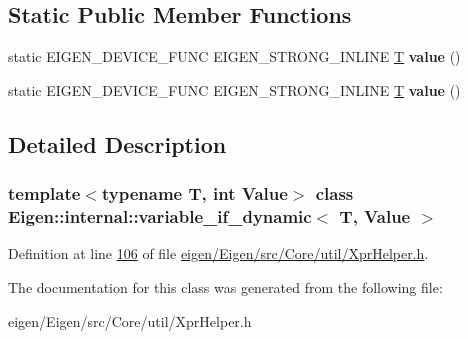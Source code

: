\subsection*{Static Public Member Functions}
\begin{DoxyCompactItemize}
\item 
\mbox{\label{class_eigen_1_1internal_1_1variable__if__dynamic_a1bb2387fda14c673bc6b0004f6849f84}} 
static E\+I\+G\+E\+N\+\_\+\+D\+E\+V\+I\+C\+E\+\_\+\+F\+U\+NC E\+I\+G\+E\+N\+\_\+\+S\+T\+R\+O\+N\+G\+\_\+\+I\+N\+L\+I\+NE \hyperlink{group___sparse_core___module}{T} {\bfseries value} ()
\item 
\mbox{\label{class_eigen_1_1internal_1_1variable__if__dynamic_a1bb2387fda14c673bc6b0004f6849f84}} 
static E\+I\+G\+E\+N\+\_\+\+D\+E\+V\+I\+C\+E\+\_\+\+F\+U\+NC E\+I\+G\+E\+N\+\_\+\+S\+T\+R\+O\+N\+G\+\_\+\+I\+N\+L\+I\+NE \hyperlink{group___sparse_core___module}{T} {\bfseries value} ()
\end{DoxyCompactItemize}


\subsection{Detailed Description}
\subsubsection*{template$<$typename T, int Value$>$\newline
class Eigen\+::internal\+::variable\+\_\+if\+\_\+dynamic$<$ T, Value $>$}



Definition at line \hyperlink{eigen_2_eigen_2src_2_core_2util_2_xpr_helper_8h_source_l00106}{106} of file \hyperlink{eigen_2_eigen_2src_2_core_2util_2_xpr_helper_8h_source}{eigen/\+Eigen/src/\+Core/util/\+Xpr\+Helper.\+h}.



The documentation for this class was generated from the following file\+:\begin{DoxyCompactItemize}
\item 
eigen/\+Eigen/src/\+Core/util/\+Xpr\+Helper.\+h\end{DoxyCompactItemize}
